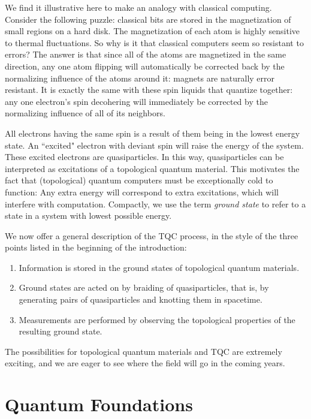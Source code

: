 \documentclass{article}
\theoremstyle{definition}
\numberwithin{figure}{section}
\begin{document}
We find it illustrative here to make an analogy with classical computing. Consider the following puzzle: classical bits are stored in the magnetization of small regions on a hard disk. The magnetization of each atom is highly sensitive to thermal fluctuations. So why is it that classical computers seem so resistant to errors? The answer is that since all of the atoms are magnetized in the same direction, any one atom flipping will automatically be corrected back by the normalizing influence of the atoms around it: magnets are naturally error resistant. It is exactly the same with these spin liquids that quantize together: any one electron's spin decohering will immediately be corrected by the normalizing influence of all of its neighbors.

All electrons having the same spin is a result of them being in the lowest energy state. An ``excited" electron with deviant spin will raise the energy of the system. These excited electrons are quasiparticles. In this way, quasiparticles can be interpreted as excitations of a topological quantum material. This motivates the fact that (topological) quantum computers must be exceptionally cold to function: Any extra energy will correspond to extra excitations, which will interfere with computation. Compactly, we use the term \textit{ground state} to refer to a state in a system with lowest possible energy.

We now offer a general description of the TQC process, in the style of the three points listed in the beginning of the introduction:

\begin{enumerate}
\item Information is stored in the ground states of topological quantum materials.
\item Ground states are acted on by braiding of quasiparticles, that is, by generating pairs of quasiparticles and knotting them in spacetime.
\item Measurements are performed by observing the topological properties of the resulting ground state.
\end{enumerate}

The possibilities for topological quantum materials and TQC are extremely exciting, and we are eager to see where the field will go in the coming years.

\section{Quantum Foundations}
\label{Quantum foundations}
\end{document}
